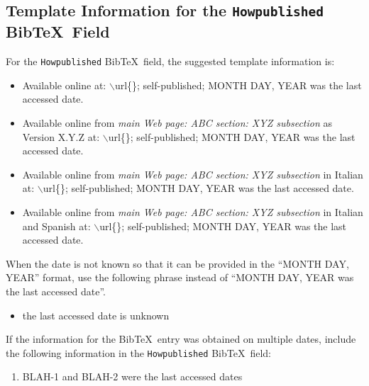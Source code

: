 \documentclass[letter,12pt]{article}
\begin{document}
\subsection{Template Information for the {\tt Howpublished} {\sc Bib}\TeX\ Field}
\label{ssec:TemplateInformationForTheHowpublishedBibTeXField}

For the {\tt Howpublished} {\sc Bib}\TeX\ field, the suggested template information is: \vspace{-0.3cm}
\begin{itemize} \itemsep -4pt
\item Available online at: $\backslash$url\{\}; self-published; MONTH DAY, YEAR was the last accessed date.
\item Available online from {\it main Web page: ABC section: XYZ subsection} as Version X.Y.Z at: $\backslash$url\{\}; self-published; MONTH DAY, YEAR was the last accessed date.
\item Available online from {\it main Web page: ABC section: XYZ subsection} in Italian at: $\backslash$url\{\}; self-published; MONTH DAY, YEAR was the last accessed date.
\item Available online from {\it main Web page: ABC section: XYZ subsection} in Italian and Spanish at: $\backslash$url\{\}; self-published; MONTH DAY, YEAR was the last accessed date.
\end{itemize}

When the date is not known so that it can be provided in the ``MONTH DAY, YEAR'' format, use the following phrase instead of ``MONTH DAY, YEAR was the last accessed date''. \vspace{-0.3cm}
\begin{itemize} \itemsep -4pt
\item the last accessed date is unknown
\end{itemize}


If the information for the {\sc Bib}\TeX\ entry was obtained on multiple dates, include the following information in the {\tt Howpublished} {\sc Bib}\TeX\ field: \vspace{-0.3cm}
\begin{enumerate} \itemsep -4pt
\item BLAH-1 and BLAH-2 were the last accessed dates
\end{enumerate}
\end{document}
